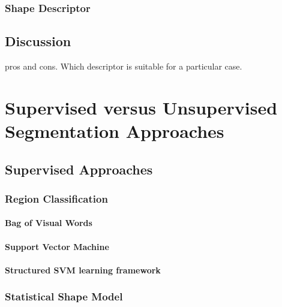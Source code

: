 \documentclass{SMBV12}
\begin{document}
\cite{arbelaez2009contours}

\subsubsection{Shape Descriptor}

\cite{gu2009recognition}

\subsection{Discussion}

pros and cons. Which descriptor is suitable for a particular case.

\section{Supervised versus Unsupervised Segmentation Approaches}



\subsection{Supervised Approaches}

\subsubsection{Region Classification}

\paragraph{Bag of Visual Words}

\paragraph{Support Vector Machine}

\paragraph{Structured SVM learning framework}

\cite{tsochantaridis2006large}

\subsubsection{Statistical Shape Model}

\cite{leventon2000statistical}
\end{document}
